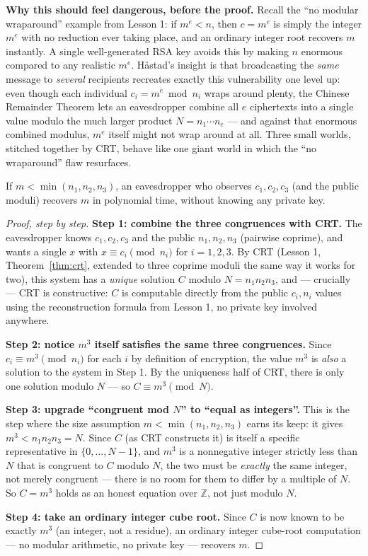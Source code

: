 \medskip\noindent\textbf{Why this should feel dangerous, before the proof.} Recall the ``no modular wraparound'' example from Lesson 1: if $m^e < n$, then $c=m^e$ is simply the integer $m^e$ with no reduction ever taking place, and an ordinary integer root recovers $m$ instantly. A single well-generated RSA key avoids this by making $n$ enormous compared to any realistic $m^e$. Håstad's insight is that broadcasting the \emph{same} message to \emph{several} recipients recreates exactly this vulnerability one level up: even though each individual $c_i = m^e \bmod n_i$ wraps around plenty, the Chinese Remainder Theorem lets an eavesdropper combine all $e$ ciphertexts into a single value modulo the much larger product $N=n_1\cdots n_e$ — and against that enormous combined modulus, $m^e$ itself might not wrap around at all. Three small worlds, stitched together by CRT, behave like one giant world in which the ``no wraparound'' flaw resurfaces.

\begin{theorem}[Håstad's broadcast attack, $e=3$ identical-message case]
If $m < \min(n_1,n_2,n_3)$, an eavesdropper who observes $c_1,c_2,c_3$ (and the public moduli) recovers $m$ in polynomial time, without knowing any private key.
\end{theorem}

\begin{proof}[Proof, step by step]
\textbf{Step 1: combine the three congruences with CRT.} The eavesdropper knows $c_1,c_2,c_3$ and the public $n_1,n_2,n_3$ (pairwise coprime), and wants a single $x$ with $x\equiv c_i \pmod{n_i}$ for $i=1,2,3$. By CRT (Lesson 1, Theorem~\ref{thm:crt}, extended to three coprime moduli the same way it works for two), this system has a \emph{unique} solution $C$ modulo $N=n_1n_2n_3$, and — crucially — CRT is constructive: $C$ is computable directly from the public $c_i,n_i$ values using the reconstruction formula from Lesson 1, no private key involved anywhere.

\textbf{Step 2: notice $m^3$ itself satisfies the same three congruences.} Since $c_i \equiv m^3 \pmod{n_i}$ for each $i$ by definition of encryption, the value $m^3$ is \emph{also} a solution to the system in Step 1. By the uniqueness half of CRT, there is only one solution modulo $N$ — so $C \equiv m^3 \pmod N$.

\textbf{Step 3: upgrade ``congruent mod $N$'' to ``equal as integers''.} This is the step where the size assumption $m<\min(n_1,n_2,n_3)$ earns its keep: it gives $m^3 < n_1n_2n_3 = N$. Since $C$ (as CRT constructs it) is itself a specific representative in $\{0,\dots,N-1\}$, and $m^3$ is a nonnegative integer strictly less than $N$ that is congruent to $C$ modulo $N$, the two must be \emph{exactly} the same integer, not merely congruent — there is no room for them to differ by a multiple of $N$. So $C = m^3$ holds as an honest equation over $\mathbb{Z}$, not just modulo $N$.

\textbf{Step 4: take an ordinary integer cube root.} Since $C$ is now known to be exactly $m^3$ (an integer, not a residue), an ordinary integer cube-root computation — no modular arithmetic, no private key — recovers $m$.
\end{proof}

